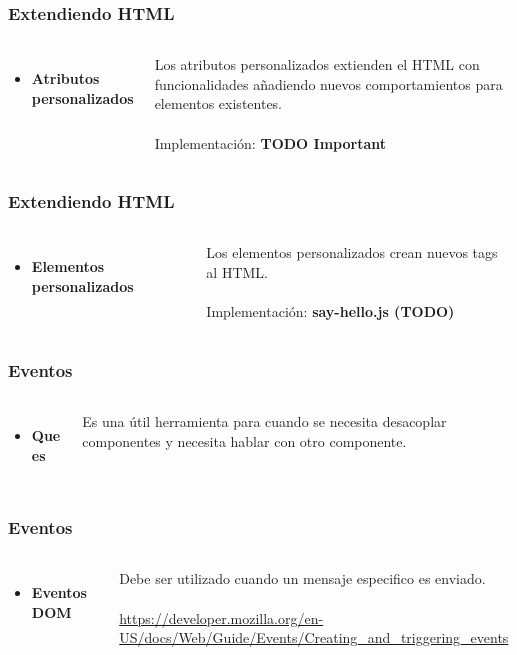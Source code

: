 \documentclass{beamer}
\begin{document}
\begin{frame}
\frametitle{Extendiendo HTML}
\begin{columns}[c]
\begin{itemize}
\item \textbf{Atributos personalizados}
\end{itemize}
Los atributos personalizados extienden el HTML con funcionalidades a\~nadiendo nuevos comportamientos para elementos
existentes.
\\~\\
Implementaci\'on: \textbf{TODO Important}
\end{columns}
\end{frame}
\begin{frame}
\frametitle{Extendiendo HTML}
\begin{columns}[c]
\begin{itemize}
\item \textbf{Elementos personalizados}
\end{itemize}
Los elementos personalizados crean nuevos tags al HTML.
\\~\\
Implementaci\'on: \textbf{say-hello.js (TODO)}
\end{columns}
\end{frame}
\begin{frame}
\frametitle{Eventos}
\begin{columns}[c]
\begin{itemize}
\item \textbf{Que es}
\end{itemize}
Es una \'util herramienta  para cuando se necesita desacoplar componentes y necesita hablar con otro componente.
\end{columns}
\end{frame}
\begin{frame}
\frametitle{Eventos}
\begin{columns}[c]
\begin{itemize}
\item \textbf{Eventos DOM}
\end{itemize}
Debe ser utilizado cuando un mensaje especifico es enviado.
\\~\\
{\color{blue}\url{https://developer.mozilla.org/en-US/docs/Web/Guide/Events/Creating_and_triggering_events}}
\end{columns}
\end{frame}
\end{document}
